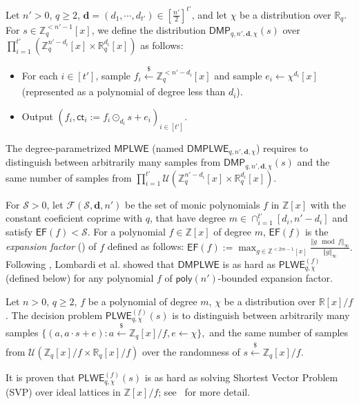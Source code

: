 \documentclass[runningheads]{llncs}
\begin{document}
\begin{definition} 
Let $n'>0$, $q\geq 2$, $\mathbf{d}=(d_1, \cdots, d_{t'})\in [\frac{n'}{2}]^{t'}$, and let $\chi$ be a distribution over $\mathbb{R}_q$. For $s\in \mathbb{Z}_q^{<n'-1}[x]$, we define the distribution $\mathsf{DMP}_{q,n',\mathbf{d}, \chi}(s)$ over $\prod_{i=1}^{t'}(\mathbb{Z}_q^{n'-d_i}[x] \times \mathbb{R}_q^{d_i}[x] )$ as follows:
\begin{itemize}
\item For each $i\in [t']$, sample $f_i  \xleftarrow[]{\$}\mathbb{Z}_q^{<n'-d_i}[x]$ and sample $e_i \leftarrow \chi^{d_i}[x]$ (represented as a polynomial of degree less than $d_i$).
\item Output $(f_i,\mathsf{ct}_i:=f_i\odot_{d_i}s+e_i)_{i \in [t']}$.
\end{itemize}
The degree-parametrized $\mathsf{MPLWE}$ (named $\mathsf{DMPLWE}_{q,n',\textbf{d}, \chi}$) requires to distinguish between arbitrarily many samples from $\mathsf{DMP}_{q,n',\mathbf{d}, \chi}(s)$ and the same number of samples from $\prod_{i=1}^{t'}\mathcal{U}(\mathbb{Z}_q^{n'-d_i}[x] \times \mathbb{R}_q^{d_i}[x] ).$
\end{definition}




For $\mathcal{S}> 0$, let $\mathcal{F}(\mathcal{S}, \mathbf{d}, n')$ be the set of monic polynomials $f$ in $\mathbb{Z}[x]$ with the constant coeficient coprime with $q$, that have degree $m \in \cap_{i=1}^{t'}[d_i, n'-d_i]$ and satisfy $\textsf{EF}(f)<\mathcal{S}$. 
For a polynomial $f \in \mathbb{Z}[x]$ of degree $m$, $\mathsf{EF}(f)$ is the {\it expansion factor} (\cite{LM06}) of $f$ defined as follows:
$\mathsf{EF}(f):=\max_{g\in \mathbb{Z}^{<2m-1}[x]}\frac{\Vert g\mod f\Vert_{\infty}}{\Vert g \Vert_{\infty}}.$
Following \cite{RSSS17}, Lombardi et al. \cite{LVV19} showed that $\mathsf{DMPLWE}$ is as hard as $\mathsf{PLWE}_{q, \chi}^{(f)}$ (defined below) for any polynomial $f$ of $\textsf{poly}(n')$-bounded expansion factor. 


\begin{definition} 
Let $n>0$, $q\geq 2$, $f$ be a polynomial of degree $m$, $\chi$ be a distribution over $\mathbb{R}[x]/f$. The decision problem $\mathsf{PLWE}^{(f)}_{q, \chi}(s)$ is to distinguish between arbitrarily many samples 
$\{(a, a\cdot s+e): a \xleftarrow[]{\$}\mathbb{Z}_q[x]/f, e\leftarrow \chi\},$
and the same number of samples from $\mathcal{U}(\mathbb{Z}_q[x]/f \times \mathbb{R}_q[x]/f)$ over the randomness of $s \xleftarrow[]{\$}\mathbb{Z}_q[x]/f$.
\end{definition}
It is proven that $\mathsf{PLWE}^{(f)}_{q, \chi}(s)$ is as hard as solving Shortest Vector Problem (SVP) over ideal lattices in $\mathbb{Z}[x]/f$; see~\cite{SSTX09} for more detail.
\end{document}
